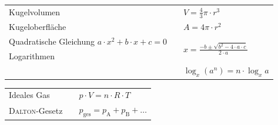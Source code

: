 \documentclass[../main.tex]{subfiles}
\begin{document}
\begin{formulabox}[Mathematik]
  \begin{center}
  \renewcommand{\arraystretch}{1.4}
    \begin{tabular}{>{\raggedleft\arraybackslash}p{} p{}p{}}
       Kugelvolumen & & $V=\frac{4}{3}\pi\cdot r^3$ \\
       Kugeloberfl\"ache & & $A=4\pi\cdot r^2$ \\
       Quadratische Gleichung $a\cdot x^2 + b\cdot x + c = 0$ & & \multirow{2}{*}{$\displaystyle x = \frac{-b\pm\sqrt{b^2-4\cdot a\cdot c}}{2\cdot a}$}\\
       Logarithmen & & $\log_x(a\cdot b) = \log_x a + \log_x b$\\
       & & $\log_x(a^n) = n\cdot \log_x a$
    \end{tabular}
  \end{center}
\end{formulabox}



\begin{formulabox}[Gase]
  \begin{center}
  \renewcommand{\arraystretch}{1.4}
    \begin{tabular}{>{\raggedleft\arraybackslash}p{} p{}p{}}
        Ideales Gas & & $p \cdot V = n \cdot R \cdot T$\\
        \textsc{Dalton}-Gesetz & & $p_{\mathrm{ges}} = p_\text{A} + p_\text{B} + \ldots $\\
    \end{tabular}
  \end{center}
\end{formulabox}
\end{document}
